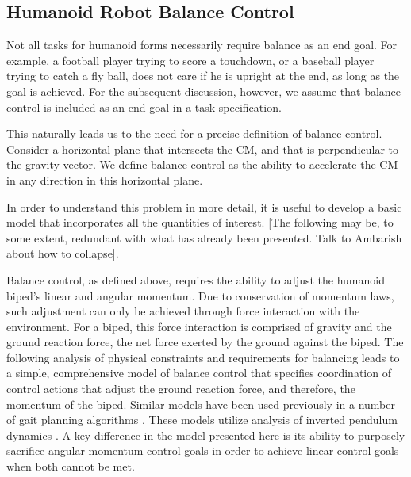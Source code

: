 \documentclass{llncs}
\begin{document}
\subsection{Humanoid Robot Balance Control}

Not all tasks for humanoid forms necessarily require balance as an end goal. 
For example, a football player trying to score a touchdown, or a baseball player trying to catch a fly ball,
does not care if he is upright at the end, as long as the goal is achieved.
For the subsequent discussion, however, we assume that balance control is included as an end goal in a task specification.

This naturally leads us to the need for a precise definition of balance control.
Consider a horizontal plane that intersects the CM, and that is perpendicular to the gravity vector.
We define balance control as the ability to accelerate the CM in any direction in this 
horizontal plane.



In order to understand this problem in more detail, it is useful to develop a basic model that incorporates
all the quantities of interest.
[The following may be, to some extent, redundant with what has already been presented.
Talk to Ambarish about how to collapse].



Balance control, as defined above, requires the ability to adjust the humanoid biped’s linear and angular momentum.  
Due to conservation of momentum laws, such adjustment can only be achieved through force interaction with the environment.  
For a biped, this force interaction is comprised of gravity and the ground reaction force, the net force exerted by the ground against the biped.  
The following analysis of physical constraints and requirements for balancing leads to a simple, comprehensive model of balance control that specifies 
coordination of control actions that adjust the ground reaction force, and therefore, the momentum of the biped.
Similar models have been used previously in a number of gait planning algorithms 
\cite{kajita2001real, yokoi2001honda, sugihara2002real, nishiwaki2002online}.
These models utilize analysis of inverted pendulum dynamics \cite{formal2006inverted}.
A key difference in the model presented here is its ability to 
purposely sacrifice angular momentum control goals in order to achieve linear control goals when both cannot be met.  
\end{document}
